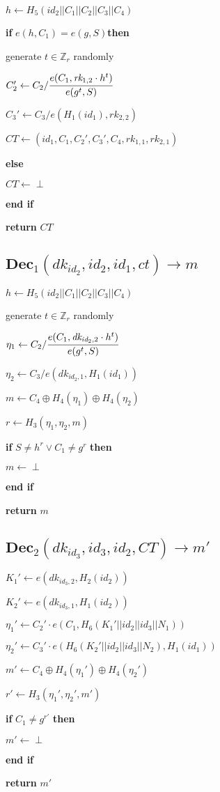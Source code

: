 \documentclass[a4paper]{article}
\begin{document}
$h \gets H_5(\textit{id}_2 || C_1 || C_2 || C_3 || C_4)$

\textbf{if} $e(h, C_1) = e(g, S) $\textbf{then}

generate $t \in \mathbb{Z}_r$ randomly

$C_2' \gets C_2 / \cfrac{e(C_1, \textit{rk}_{1, 2} \cdot h^t)}{e(g^t, S)}$

$C_3' \gets C_3 / e(H_1(\textit{id}_1), \textit{rk}_{2, 2})$

$\textit{CT} \gets (\textit{id}_1, C_1, C_2', C_3', C_4, \textit{rk}_{1, 1}, \textit{rk}_{2, 1})$

\textbf{else}

\quad$\textit{CT} \gets \perp$

\textbf{end if}

\textbf{return} $\textit{CT}$

\subsection{$\textbf{Dec}_1(\textit{dk}_{\textit{id}_2}, \textit{id}_2, \textit{id}_1, \textit{ct}) \rightarrow m$}

$h \gets H_5(\textit{id}_2 || C_1 || C_2 || C_3 || C_4)$

generate $t \in \mathbb{Z}_r$ randomly

$\eta_1 \gets C_2 / \cfrac{e(C_1, \textit{dk}_{\textit{id}_2, 2} \cdot h^t)}{e(g^t, S)}$

$\eta_2 \gets C_3 / e(\textit{dk}_{\textit{id}_2, 1}, H_1(\textit{id}_1))$

$m \gets C_4 \oplus H_4(\eta_1) \oplus H_4(\eta_2)$

$r \gets H_3(\eta_1, \eta_2, m)$

\textbf{if} $S \neq h^r \lor C_1 \neq g^r$ \textbf{then}

\quad$m \gets \perp$

\textbf{end if}

\textbf{return} $m$

\subsection{$\textbf{Dec}_2(\textit{dk}_{\textit{id}_3}, \textit{id}_3, \textit{id}_2, \textit{CT}) \rightarrow m'$}

$K_1' \gets e(\textit{dk}_{\textit{id}_3, 2}, H_2(\textit{id}_2))$

$K_2' \gets e(\textit{dk}_{\textit{id}_3, 1}, H_1(\textit{id}_2))$

$\eta_1' \gets C_2' \cdot e(C_1, H_6(K_1' || \textit{id}_2 || \textit{id}_3 || N_1))$

$\eta_2' \gets C_3' \cdot e(H_6(K_2' || \textit{id}_2 || \textit{id}_3 || N_2), H_1(\textit{id}_1))$

$m' \gets C_4 \oplus H_4(\eta_1') \oplus H_4(\eta_2')$

$r' \gets H_3(\eta_1', \eta_2', m')$

\textbf{if} $C_1 \neq g^{r'}$ \textbf{then}

\quad$m' \gets \perp$

\textbf{end if}

\textbf{return} $m'$
\end{document}
